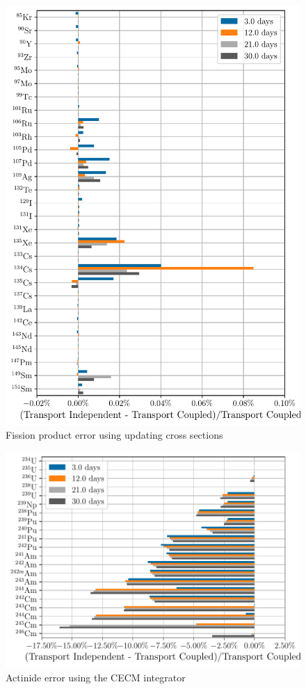     \begin{figure}[htpb]
        \centering
        \includegraphics[width=\linewidth]{figs/fission_products_updating_xs_predictor_fission_q_days.pdf}
        \caption{Fission product error using updating cross sections}
        \label{fig:fp-error-updating-xs}
    \end{figure}

    \begin{figure}[htpb]
        \centering
        \includegraphics[width=\linewidth]{figs/actinides_constant_xs_cecm_fission_q_days.pdf}
        \caption{Actinide error using the CECM integrator}
        \label{fig:actinides-error-cecm}
    \end{figure}



